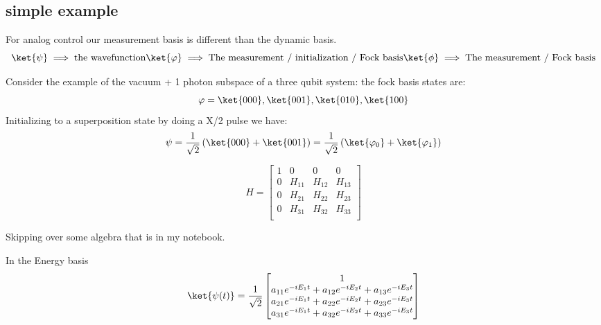 \subsection{simple example}
For analog control our measurement basis is different than the dynamic basis.
\begin{equation*}
    \ket{\psi} \implies \textrm{the wavefunction}
    \ket{\varphi} \implies \textrm{The measurement / initialization / Fock basis}
    \ket{\phi} \implies \textrm{The measurement / Fock basis}
\end{equation*}

Consider the example of the vacuum + 1 photon subspace of a three qubit system:
the fock basis states are:
\begin{equation*}
    \varphi = \ket{000}, \ket{001}, \ket{010}, \ket{100}
\end{equation*}
Initializing to a superposition state by doing a X/2 pulse we have:
\begin{equation*}
    \psi = \frac{1}{\sqrt{2}} \left( \ket{000} + \ket{001} \right) = \frac{1}{\sqrt{2}} \left( \ket{\varphi_0} + \ket{\varphi_1} \right)
\end{equation*}

\begin{equation}
    H=
    \begin{bmatrix}
        1 & 0 & 0 & 0 \\
        0 & H_{11} & H_{12} & H_{13} \\
        0 & H_{21} & H_{22} & H_{23} \\
        0 & H_{31} & H_{32} & H_{33} \\
    \end{bmatrix}
\end{equation}


Skipping over some algebra that is in my notebook.

In the Energy basis
\begin{equation}
    \ket{\psi (t)} = \frac{1}{\sqrt{2}}
    \begin{bmatrix}
        1 \\
        a_{11} e^{-i E_1 t} + a_{12} e^{-i E_2 t} + a_{13} e^{-i E_3 t} \\
        a_{21} e^{-i E_1 t} + a_{22} e^{-i E_2 t} + a_{23} e^{-i E_3 t} \\
        a_{31} e^{-i E_1 t} + a_{32} e^{-i E_2 t} + a_{33} e^{-i E_3 t}
    \end{bmatrix}
\end{equation}

